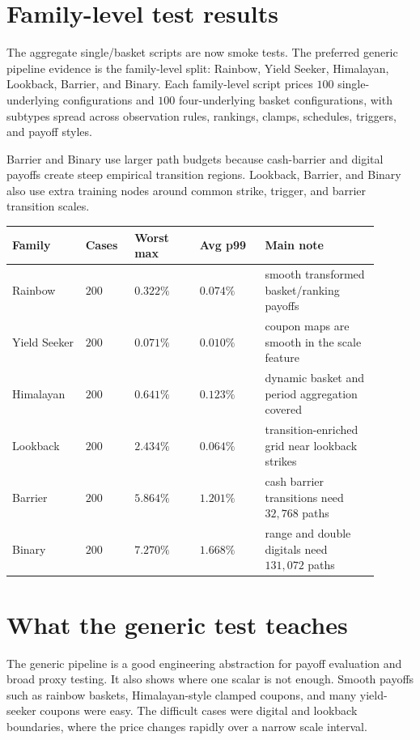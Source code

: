\documentclass[11pt,oneside]{book}
\theoremstyle{definition}
\begin{document}
\section{Family-level test results}
The aggregate single/basket scripts are now smoke tests. The preferred generic
pipeline evidence is the family-level split: Rainbow, Yield Seeker, Himalayan,
Lookback, Barrier, and Binary. Each family-level script prices \(100\)
single-underlying configurations and \(100\) four-underlying basket
configurations, with subtypes spread across observation rules, rankings,
clamps, schedules, triggers, and payoff styles.

Barrier and Binary use larger path budgets because cash-barrier and digital
payoffs create steep empirical transition regions. Lookback, Barrier, and
Binary also use extra training nodes around common strike, trigger, and barrier
transition scales.

\begin{longtable}{@{}>{\raggedright\arraybackslash}p{0.18\linewidth}>{\raggedleft\arraybackslash}p{0.12\linewidth}>{\raggedleft\arraybackslash}p{0.16\linewidth}>{\raggedleft\arraybackslash}p{0.16\linewidth}>{\raggedright\arraybackslash}p{0.28\linewidth}@{}}
\toprule
Family & Cases & Worst max & Avg p99 & Main note\\
\midrule
Rainbow & \(200\) & \(0.322\%\) & \(0.074\%\) & smooth transformed basket/ranking payoffs\\
Yield Seeker & \(200\) & \(0.071\%\) & \(0.010\%\) & coupon maps are smooth in the scale feature\\
Himalayan & \(200\) & \(0.641\%\) & \(0.123\%\) & dynamic basket and period aggregation covered\\
Lookback & \(200\) & \(2.434\%\) & \(0.064\%\) & transition-enriched grid near lookback strikes\\
Barrier & \(200\) & \(5.864\%\) & \(1.201\%\) & cash barrier transitions need \(32{,}768\) paths\\
Binary & \(200\) & \(7.270\%\) & \(1.668\%\) & range and double digitals need \(131{,}072\) paths\\
\bottomrule
\end{longtable}

\section{What the generic test teaches}
The generic pipeline is a good engineering abstraction for payoff evaluation
and broad proxy testing. It also shows where one scalar is not enough. Smooth
payoffs such as rainbow baskets, Himalayan-style clamped coupons, and many
yield-seeker coupons were easy. The difficult cases were digital and lookback
boundaries, where the price changes rapidly over a narrow scale interval.
\end{document}
